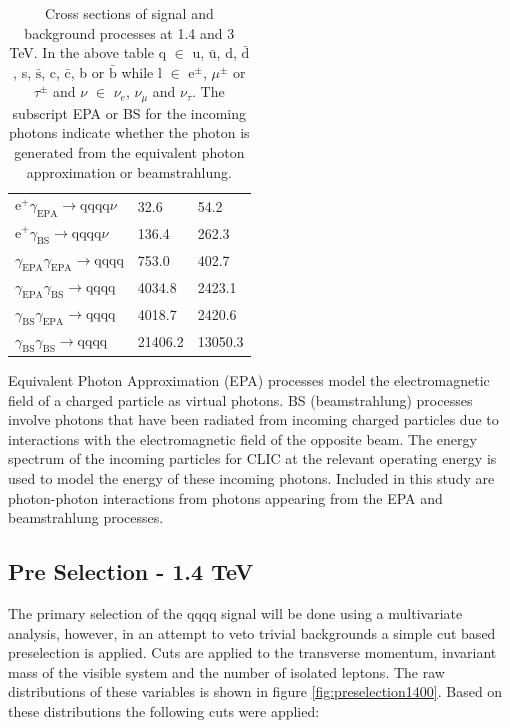 \begin{table}[h!]
\begin{tabular}{ l l l}
$\text{e}^{+}\gamma_{\text{EPA}} \rightarrow \text{qqqq}\nu$ & 32.6 & 54.2 \\
$\text{e}^{+}\gamma_{\text{BS}} \rightarrow \text{qqqq}\nu$ & 136.4 & 262.3 \\
$\gamma_{\text{EPA}}\gamma_{\text{EPA}} \rightarrow \text{qqqq}$ & 753.0 & 402.7 \\
$\gamma_{\text{EPA}}\gamma_{\text{BS}} \rightarrow \text{qqqq}$ & 4034.8 & 2423.1 \\
$\gamma_{\text{BS}}\gamma_{\text{EPA}} \rightarrow \text{qqqq}$ & 4018.7 & 2420.6 \\
$\gamma_{\text{BS}}\gamma_{\text{BS}} \rightarrow \text{qqqq}$ & 21406.2 & 13050.3 \\
\hline
\end{tabular}
\caption[]{Cross sections of signal and background processes at 1.4 and 3 TeV. In the above table q $\in$ u, $\bar{\text{u}}$, d, $\bar{\text{d}}$, s, $\bar{\text{s}}$, c, $\bar{\text{c}}$, b or $\bar{\text{b}}$ while l $\in$ $\text{e}^{\pm}$, $\mu^{\pm}$ or $\tau^{\pm}$ and $\nu$ $\in$ $\nu_{e}$, $\nu_{\mu}$ and $\nu_{\tau}$.  The subscript EPA or BS for the incoming photons indicate whether the photon is generated from the equivalent photon approximation or beamstrahlung.}
\label{table:crosssectionfull}
\end{table}

Equivalent Photon Approximation (EPA) processes model the electromagnetic field of a charged particle as virtual photons.  BS (beamstrahlung) processes involve photons that have been radiated from incoming charged particles due to interactions with the electromagnetic field of the opposite beam.   The energy spectrum of the incoming particles for CLIC at the relevant operating energy is used to model the energy of these incoming photons.  Included in this study are photon-photon interactions from photons appearing from the EPA and beamstrahlung processes.

\subsection{Pre Selection - 1.4 TeV}
\label{sec:preselection1400GeV}
The primary selection of the \nu{\nu}qqqq signal will be done using a multivariate analysis, however, in an attempt to veto trivial backgrounds a simple cut based preselection is applied. Cuts are applied to the transverse momentum, invariant mass of the visible system and the number of isolated leptons. The raw distributions of these variables is
shown in figure \ref{fig:preselection1400}. Based on these distributions the following cuts were applied:

